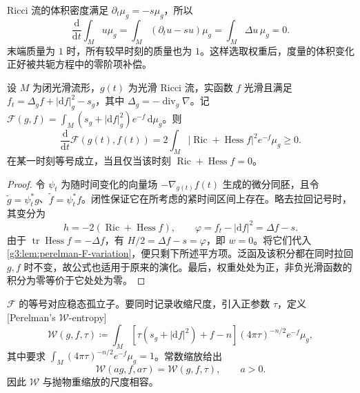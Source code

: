 \ProseParagraphBreak
Ricci 流的体积密度满足 \(\partial_t\mu_g=-s\mu_g\)，所以
\begin{equation}\label{g3:eq:ricci-conjugate-mass}
	\frac{\mathrm d}{\mathrm dt}\int_Mu\mu_g
	=\int_M(\partial_tu-su)\mu_g
	=\int_M\Delta u\,\mu_g=0.
\end{equation}
末端质量为 \(1\) 时，所有较早时刻的质量也为 \(1\)。这样选取权重后，度量的体积变化正好被共轭方程中的零阶项补偿。

\begin{theorem}\label{g3:thm:perelman-F-monotonicity}
	设 \(M\) 为闭光滑流形，\(g(t)\) 为光滑 Ricci 流，实函数 \(f\) 光滑且满足 \(f_t=\Delta_gf+|\mathrm df|_g^2-s_g\)，其中 \(\Delta_g=-\operatorname{div}_g\nabla\)。记 \(\mathcal F(g,f)=\int_M(s_g+|\mathrm df|_g^2)e^{-f}\,\mathrm d\mu_g\)。则
	\begin{equation}\label{g3:eq:perelman-F-monotonicity}
		\frac{\mathrm d}{\mathrm dt}\mathcal F(g(t),f(t))
		=2\int_M|\operatorname{Ric}+\operatorname{Hess}f|^2e^{-f}\mu_g\ge0.
	\end{equation}
	在某一时刻等号成立，当且仅当该时刻 \(\operatorname{Ric}+\operatorname{Hess}f=0\)。
\end{theorem}
\begin{proof}
	令 \(\psi_t\) 为随时间变化的向量场 \(-\nabla_{g(t)}f(t)\) 生成的微分同胚，且令 \(\widetilde g=\psi_t^*g\)、\(\widetilde f=\psi_t^*f\)。闭性保证它在所考虑的紧时间区间上存在。略去拉回记号时，其变分为
	\[
		h=-2(\operatorname{Ric}+\operatorname{Hess}f),
		\qquad \varphi=f_t-|\mathrm df|^2=\Delta f-s.
	\]
	由于 \(\operatorname{tr}\operatorname{Hess}f=-\Delta f\)，有 \(H/2=\Delta f-s=\varphi\)，即 \(w=0\)。将它们代入\cref{g3:lem:perelman-F-variation}，便只剩下所述平方项。泛函及该积分都在同时拉回 \(g,f\) 时不变，故公式也适用于原来的演化。最后，权重处处为正，非负光滑函数的积分为零等价于它处处为零。
\end{proof}

\(\mathcal F\) 的等号对应稳态孤立子。要同时记录收缩尺度，引入正参数 \(\tau\)，定义[Perelman's \(\mathcal W\)-entropy]
\begin{equation}\label{g3:eq:perelman-W-definition}
	\mathcal W(g,f,\tau)\coloneqq
	\int_M\left[\tau(s_g+|\mathrm df|^2)+f-n\right]
	(4\pi\tau)^{-n/2}e^{-f}\mu_g,
\end{equation}
其中要求 \(\int_M(4\pi\tau)^{-n/2}e^{-f}\mu_g=1\)。常数缩放给出
\[
	\mathcal W(ag,f,a\tau)=\mathcal W(g,f,\tau),\qquad a>0.
\]
因此 \(\mathcal W\) 与抛物重缩放的尺度相容。

